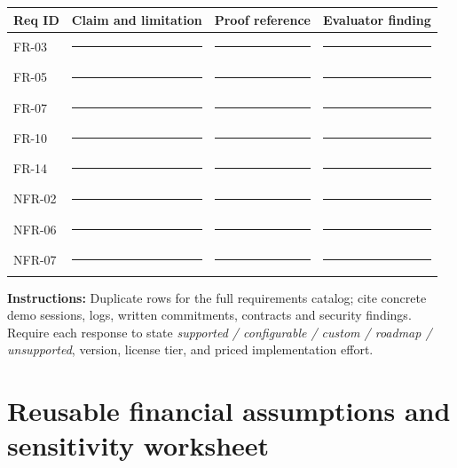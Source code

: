 \documentclass[10pt,letterpaper]{article}
\begin{document}
\begin{longtable}{@{}L{0.65in}L{2.45in}L{1.44in}L{1.71in}@{}}
\toprule
\textbf{Req ID} & \textbf{Claim and limitation} & \textbf{Proof reference} & \textbf{Evaluator finding}\\\midrule\endhead
FR-03 & \rule{2.05in}{0.4pt} & \rule{1.20in}{0.4pt} & \rule{1.46in}{0.4pt}\\[1pt]
FR-05 & \rule{2.05in}{0.4pt} & \rule{1.20in}{0.4pt} & \rule{1.46in}{0.4pt}\\[1pt]
FR-07 & \rule{2.05in}{0.4pt} & \rule{1.20in}{0.4pt} & \rule{1.46in}{0.4pt}\\[1pt]
FR-10 & \rule{2.05in}{0.4pt} & \rule{1.20in}{0.4pt} & \rule{1.46in}{0.4pt}\\[1pt]
FR-14 & \rule{2.05in}{0.4pt} & \rule{1.20in}{0.4pt} & \rule{1.46in}{0.4pt}\\[1pt]
NFR-02 & \rule{2.05in}{0.4pt} & \rule{1.20in}{0.4pt} & \rule{1.46in}{0.4pt}\\[1pt]
NFR-06 & \rule{2.05in}{0.4pt} & \rule{1.20in}{0.4pt} & \rule{1.46in}{0.4pt}\\[1pt]
NFR-07 & \rule{2.05in}{0.4pt} & \rule{1.20in}{0.4pt} & \rule{1.46in}{0.4pt}\\[1pt]
\bottomrule
\end{longtable}
\textbf{Instructions:} Duplicate rows for the full requirements catalog; cite concrete demo sessions, logs, written commitments, contracts and security findings. Require each response to state \emph{supported / configurable / custom / roadmap / unsupported}, version, license tier, and priced implementation effort.

\section{Reusable financial assumptions and sensitivity worksheet}
\end{document}
